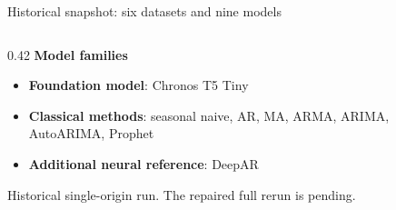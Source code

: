 \documentclass[aspectratio=169,10pt]{beamer}
\newcommand{\key}[1]{{\color{Teal}\textbf{#1}}}
\begin{document}
\begin{frame}{Historical snapshot: six datasets and nine models}
\begin{columns}[T,totalwidth=0.96\linewidth]
    \begin{column}{0.42\linewidth}
      \small
      \textbf{Model families}
      \begin{itemize}
        \item \key{Foundation model}: Chronos T5 Tiny
        \item \key{Classical methods}: seasonal naive, AR, MA,
          ARMA, ARIMA, AutoARIMA, Prophet
        \item \key{Additional neural reference}: DeepAR
      \end{itemize}

      \vspace{0.22cm}
      {\color{Muted}\scriptsize Historical single-origin run. The repaired full rerun is pending.}
    \end{column}
  \end{columns}
\end{frame}
\end{document}
